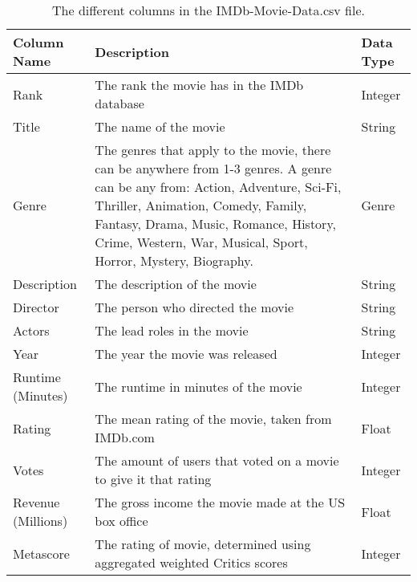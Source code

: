     \begin{table}[h]
        \centering
        \begin{tabular}{lp{10cm}l}
            \toprule
            Column Name        & Description                                                                & Data Type \\
            \midrule
            Rank               & The rank the movie has in the IMDb database                                & Integer   \\
            Title              & The name of the movie                                                      & String    \\
            Genre              & The genres that apply to the movie, there can be anywhere from 1-3 genres.
            A genre can be any from: Action, Adventure, Sci-Fi, Thriller, Animation,
                Comedy, Family, Fantasy, Drama, Music, Romance, History, Crime, Western, War,
                Musical, Sport, Horror, Mystery, Biography.
                               & Genre                                                                                  \\
            Description        & The description of the movie                                               & String    \\
            Director           & The person who directed the movie                                          & String    \\
            Actors             & The lead roles in the movie                                                & String    \\
            Year               & The year the movie was released                                            & Integer   \\
            Runtime (Minutes)  & The runtime in minutes of the movie                                        & Integer   \\
            Rating             & The mean rating of the movie, taken from IMDb.com                          & Float     \\
            Votes              & The amount of users that voted on a movie to give it that rating           & Integer   \\
            Revenue (Millions) & The gross income the movie made at the US box office                       & Float     \\
            Metascore          & The rating of movie, determined using aggregated weighted Critics scores   & Integer   \\
            \bottomrule
        \end{tabular}
        \caption[short]{The different columns in the IMDb-Movie-Data.csv file.}\label{tab-IMDb-Movie-Data-Column-Description}
    \end{table}
